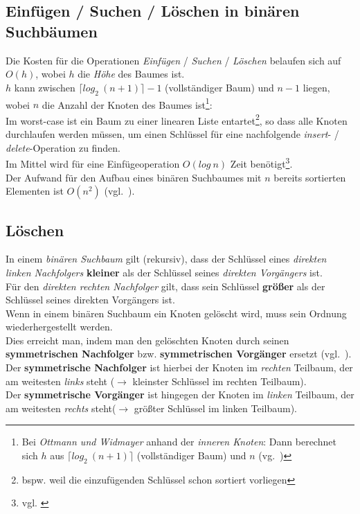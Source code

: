 \subsection{Einfügen / Suchen / Löschen in binären Suchbäumen}

Die Kosten für die Operationen \textit{Einfügen} / \textit{Suchen} / \textit{Löschen} belaufen sich auf $O(h)$, wobei $h$ die \textit{Höhe} des Baumes ist.\\
$h$ kann zwischen $\lceil log_2\ (n + 1) \rceil - 1$ (vollständiger Baum) und $n - 1$ liegen, wobei $n$ die Anzahl der Knoten des Baumes ist\footnote{
Bei \textit{Ottmann und Widmayer} anhand der  \textit{inneren Knoten}: Dann berechnet sich $h$  aus $\lceil log_2\ (n + 1) \rceil$ (vollständiger Baum) und $n$ (vg.~\cite[275]{OW17e})
}:\\
\noindent
Im worst-case ist ein Baum zu einer linearen Liste entartet\footnote{
    bspw. weil die einzufügenden Schlüssel schon sortiert vorliegen
}, so dass alle Knoten durchlaufen werden müssen, um einen Schlüssel für eine nachfolgende \textit{insert}- / \textit{delete}-Operation zu finden.\\

\noindent
Im Mittel wird für eine Einfügeoperation $O(log\ n)$ Zeit benötigt\footnote{
    vgl. \cite[136 ff.]{GD18d}
}.\\


\noindent
Der Aufwand für den Aufbau eines binären Suchbaumes mit $n$ bereits sortierten Elementen ist $O(n^2)$ (vgl.~\cite[235 f.]{GD18d}).


\subsection{Löschen}

In einem \textit{binären Suchbaum} gilt (rekursiv), dass der Schlüssel eines \textit{direkten linken Nachfolgers} \textbf{kleiner} als der Schlüssel seines \textit{direkten Vorgängers} ist.\\
Für den \textit{direkten rechten Nachfolger} gilt, dass sein Schlüssel \textbf{größer} als der Schlüssel seines direkten Vorgängers ist.\\

\noindent
Wenn in einem binären Suchbaum ein Knoten gelöscht wird, muss sein Ordnung wiederhergestellt werden.\\

\noindent
Dies erreicht man, indem man den gelöschten Knoten durch seinen \textbf{symmetrischen Nachfolger} bzw. \textbf{symmetrischen Vorgänger} ersetzt (vgl.~\cite[269, 272]{OW17e}).\\
Der \textbf{symmetrische Nachfolger} ist hierbei der Knoten im \textit{rechten} Teilbaum, der am weitesten \textit{links} steht ($\rightarrow$ kleinster Schlüssel im rechten Teilbaum).\\
Der \textbf{symmetrische Vorgänger} ist hingegen der Knoten im \textit{linken} Teilbaum,  der am weitesten \textit{rechts} steht($\rightarrow$ größter Schlüssel im linken Teilbaum).\\

